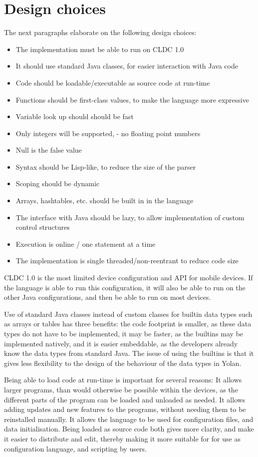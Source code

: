 \documentclass[11pt]{report}
\begin{document}
\section{Design choices}
The next paragraphs elaborate on the following design choices:
\begin{itemize}
\item The implementation must be able to run on CLDC 1.0
\item It should use standard Java classes, for easier interaction with Java code
\item Code should be loadable/executable as source code at run-time
\item Functions should be first-class values, to make the language more expressive
\item Variable look up should should be fast
\item Only integers will be supported, - no floating point numbers
\item Null is the false value
\item Syntax should be Lisp-like, to reduce the size of the parser
\item Scoping should be dynamic
\item Arrays, hashtables, etc. should be built in in the language
\item The interface with Java should be lazy, to allow implementation of custom control structures
\item Execution is online / one statement at a time
\item The implementation is single threaded/non-reentrant to reduce code size
\end{itemize}

CLDC 1.0 is the most limited device configuration and API for mobile devices. If the language is able to run this configuration, it will also be able to run on the other Java configurations, and then be able to run on most devices.

\label{yolandesign}
Use of standard Java classes instead of custom classes for builtin data types such as arrays or tables has three benefits: the code footprint is smaller, as these data types do not have to be implemented, it may be faster, as the builtins may be implemented natively, and it is easier embeddable, as the developers already know the data types from standard Java.
The issue of using the builtins is that it gives less flexibility to the design of the behaviour of the data types in Yolan.

Being able to load code at run-time is important for several reasons:
It allows larger programs, than would otherwise be possible within the devices, as the different parts of the program can be loaded and unloaded as needed.
It allows adding updates and new features to the programs, without needing them to be reinstalled manually.
It allows the language to be used for configuration files, and data initialisation.
Being loaded as source code both gives more clarity, and make it easier to distribute and edit, thereby making it more suitable for for use as configuration language, and scripting by users.
\end{document}
